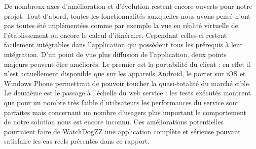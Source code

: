 De nombreux axes d’amélioration et d’évolution restent encore ouverts pour notre projet. Tout d’abord, toutes les fonctionnalités auxquelles nous avons pensé n’ont pas toutes été implémentées comme par exemple la vue en réalité virtuelle de l’établissement ou encore le calcul d’itinéraire. Cependant celles-ci restent facilement intégrables dans l’application qui possèdent tous les prérequis à leur intégration. D’un point de vue plus diffusion de l’application, deux points majeurs peuvent être améliorés. Le premier est la portabilité du client : en effet il n’est actuellement disponible que sur les appareils Android, le porter sur iOS et Windows Phone permettrait de pouvoir toucher la quasi-totalité du marché cible. Le deuxième est le passage à l’échelle du web service : les tests exécutés montrent que pour un nombre très faible d’utilisateurs les performances du service sont parfaites mais concernant un nombre d’usagers plus important le comportement de notre solution nous est encore inconnu. Ces améliorations potentielles pourraient faire de WatchDogZZ une application complète et sérieuse pouvant satisfaire les cas réels présentés dans ce rapport.
